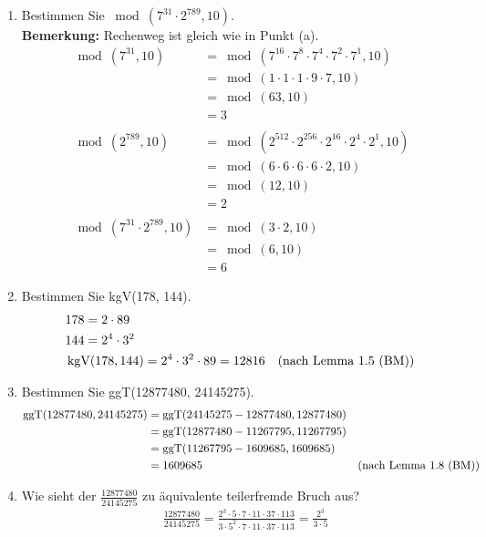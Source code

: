 \begin{enumerate}[label=(\alph*)]
		\item  Bestimmen Sie $ \bmod(7^{31} \cdot 2^{789}, 10) $. \\
		\textbf{Bemerkung:} Rechenweg ist gleich wie in Punkt (a).
		\begin{align*}
			\bmod(7^{31},10) &= \bmod(7^{16}\cdot7^{8}\cdot7^{4}\cdot7^{2}\cdot7^{1},10)
			\\&= \bmod(1\cdot1\cdot1\cdot9\cdot7,10)
			\\&= \bmod(63,10)
			\\&= 3 \\\\
			\bmod(2^{789},10) &= \bmod(2^{512}\cdot2^{256}\cdot2^{16}\cdot2^4\cdot2^1,10)
			\\&= \bmod(6\cdot 6\cdot 6\cdot 6\cdot 2, 10)
			\\&= \bmod(12,10)
			\\&= 2 \\\\
			\bmod(7^{31} \cdot 2^{789}, 10) &= \bmod(3 \cdot 2,10)
			\\&= \bmod(6,10)
			\\&= 6 
		\end{align*}

		\item Bestimmen Sie kgV(178, 144).
		\begin{align*}
			& 178 = 2\cdot89 \\
			& 144 = 2^4\cdot3^2 \\
			&\operatorname{kgV}(178, 144) = 2^4\cdot3^2\cdot89 = 12816
		 	&\textrm{(nach Lemma 1.5 (BM))}
		\end{align*}

		\item Bestimmen Sie ggT(12877480, 24145275).
		\begin{align*}
			\operatorname{ggT}(12877480, 24145275) &= \operatorname{ggT}(24145275-12877480, 12877480)
			\\& = \operatorname{ggT}(12877480-11267795,11267795)
			\\& = \operatorname{ggT}(11267795-1609685,1609685)
			\\& = 1609685
		 	&\textrm{(nach Lemma 1.8 (BM))}
		\end{align*}

		\item Wie sieht der $\frac{12877480}{24145275}$ zu äquivalente teilerfremde Bruch aus?
		\begin{align*}
			& \frac{12877480}{24145275} = \frac{2^3 \cdot 5 \cdot 7 \cdot 11 \cdot 37 \cdot 113}
			{3 \cdot 5^2 \cdot 7 \cdot 11 \cdot 37 \cdot 113} = \frac{2^3}{3 \cdot 5}
		\end{align*}


\end{enumerate}
